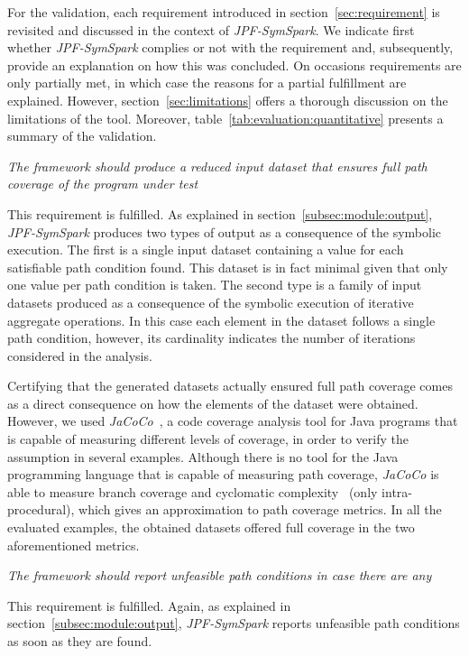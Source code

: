 
For the validation, each requirement introduced in section~\ref{sec:requirement} is revisited and discussed in the context of \textit{JPF-SymSpark}. We indicate first whether \textit{JPF-SymSpark} complies or not with the requirement and, subsequently, provide an explanation on how this was concluded. On occasions requirements are only partially met, in which case the reasons for a partial fulfillment are explained. However, section~\ref{sec:limitations} offers a thorough discussion on the limitations of the tool. Moreover, table~\ref{tab:evaluation:quantitative} presents a summary of the validation.

\begin{itemize}
 \textit{The framework should produce a reduced input dataset that ensures full path coverage of the program under test}

This requirement is fulfilled. As explained in section~\ref{subsec:module:output}, \textit{JPF-SymSpark} produces two types of output as a consequence of the symbolic execution. The first is a single input dataset containing a value for each satisfiable path condition found. This dataset is in fact minimal given that only one value per path condition is taken. The second type is a family of input datasets produced as a consequence of the symbolic execution of iterative aggregate operations. In this case each element in the dataset follows a single path condition, however, its cardinality indicates the number of iterations considered in the analysis.

Certifying that the generated datasets actually ensured full path coverage comes as a direct consequence on how the elements of the dataset were obtained. However, we used \textit{JaCoCo}~\cite{JaCoCo2017}, a code coverage analysis tool for Java programs that is capable of measuring different levels of coverage, in order to verify the assumption in several examples. Although there is no tool for the Java programming language that is capable of measuring path coverage, \textit{JaCoCo} is able to measure branch coverage and cyclomatic complexity~\cite{McCabe1976} (only intra-procedural), which gives an approximation to path coverage metrics. In all the evaluated examples, the obtained datasets offered full coverage in the two aforementioned metrics.

 \textit{The framework should report unfeasible path conditions in case there are any}

This requirement is fulfilled. Again, as explained in section~\ref{subsec:module:output}, \textit{JPF-SymSpark} reports unfeasible path conditions as soon as they are found.


\end{itemize}
